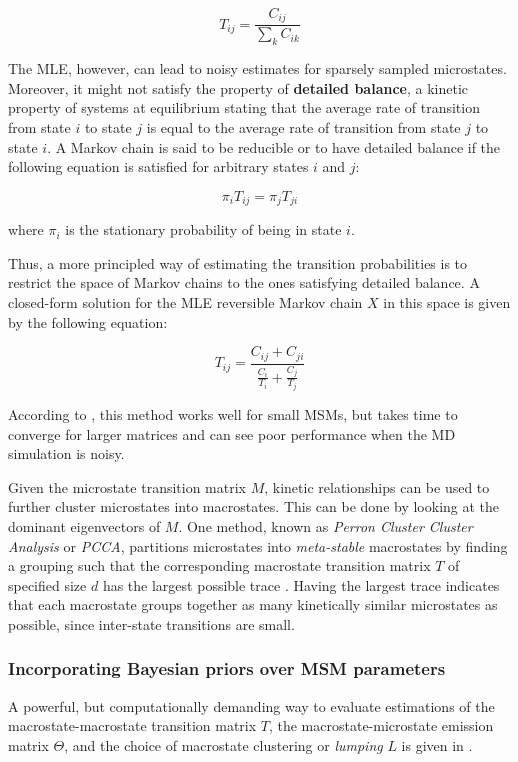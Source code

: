 \documentclass{article}
\begin{document}
$$T_{ij} = \dfrac{C_{ij}}{\sum_k C_{ik}}$$

The MLE, however, can lead to noisy estimates for sparsely sampled microstates. Moreover, it might not satisfy the property of \textbf{detailed balance}, a kinetic property of systems at equilibrium stating that the average rate of transition from state $i$ to state $j$ is equal to the average rate of transition from state $j$ to state $i$. A Markov chain is said to be reducible or to have detailed balance if the following equation is satisfied for arbitrary states $i$ and $j$:

$$\pi_i T_{ij} = \pi_j T_{ji}$$

where $\pi_i$ is the stationary probability of being in state $i$.

Thus, a more principled way of estimating the transition probabilities is to restrict the space of Markov chains to the ones satisfying detailed balance. A closed-form solution for the MLE reversible Markov chain $X$ in this space is given by the following equation:

$$T_{ij} = \dfrac{C_{ij} + C_{ji}}{\frac{C_i}{T_i} + \frac{C_j}{T_j}}$$

According to \cite{pande2009}, this method works well for small MSMs, but takes time to converge for larger matrices and can see poor performance when the MD simulation is noisy. 

Given the microstate transition matrix $M$, kinetic relationships can be used to further cluster microstates into macrostates. This can be done by looking at the dominant eigenvectors of $M$. One method, known as \textit{Perron Cluster Cluster Analysis} or \textit{PCCA}, partitions microstates into \textit{meta-stable} macrostates by finding a grouping such that the corresponding macrostate transition matrix $T$ of specified size $d$ has the largest possible trace \cite{fishbach}. Having the largest trace indicates that each macrostate groups together as many kinetically similar microstates as possible, since inter-state transitions are small.

\subsubsection{Incorporating Bayesian priors over MSM parameters}
A powerful, but computationally demanding way to evaluate estimations of the macrostate-macrostate transition matrix $T$, the macrostate-microstate emission matrix $\Theta$, and the choice of macrostate clustering or \textit{lumping} $L$ is given in \cite{msmprior}. 
\end{document}
